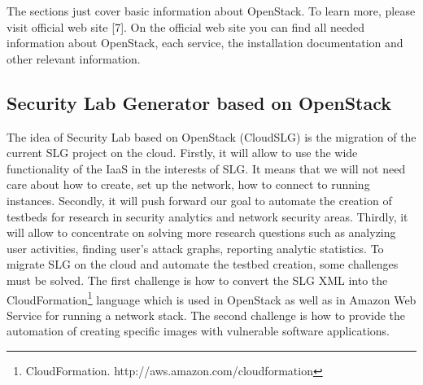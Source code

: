 The sections just cover basic information about OpenStack. To learn more, please visit official web site [7]. On the official web site you can find all needed information about OpenStack, each service, the installation documentation and other relevant information. 


\subsection{Security Lab Generator based on OpenStack}
The idea of Security Lab based on OpenStack (CloudSLG) is the migration of the current SLG project on the cloud. Firstly, it will allow to use the wide functionality of the IaaS in the interests of SLG. It means that we will not need care about how to create, set up the network, how to connect to running instances. Secondly, it will push forward our goal to automate the creation of testbeds for research in security analytics and network security areas. Thirdly, it will allow to concentrate on solving more research questions such as analyzing user activities, finding user's attack graphs, reporting analytic statistics. To migrate SLG on the cloud and automate the testbed creation, some challenges must be solved. The first challenge is how to convert the SLG XML into the CloudFormation\footnote{CloudFormation. http://aws.amazon.com/cloudformation} language which is used in OpenStack as well as in Amazon Web Service for running a network stack. The second challenge is how to provide the automation of creating specific images with vulnerable software applications.



% 
